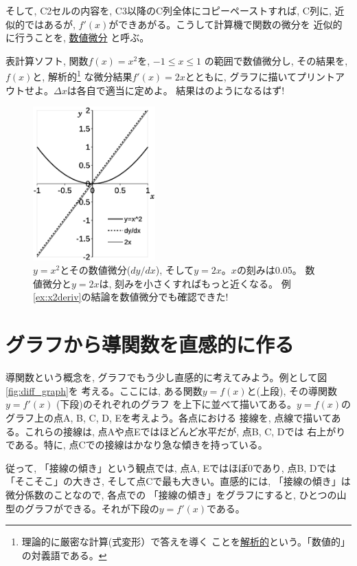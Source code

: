 そして, C2セルの内容を, C3以降のC列全体にコピーペーストすれば, C列に, 
近似的ではあるが, $f'(x)$ができあがる。こうして計算機で関数の微分を
近似的に行うことを, \underline{数値微分} と呼ぶ。\hv

\begin{q}\label{q:comp_diff0} 表計算ソフト, 関数$f(x)=x^2$を, $-1 \le x \le 1$
の範囲で数値微分し, その結果を, $f(x)$と, 解析的\footnote{理論的に厳密な計算(式変形）で答えを導く
ことを\underline{解析的}という。「数値的」の対義語である。}
な微分結果$f'(x)=2x$とともに, グラフに描いてプリントアウトせよ。$\Delta x$は各自で適当に定めよ。
結果はのようになるはず!
\end{q}
\begin{figure}[!h]
    \centering
    \includegraphics[width=4.7cm]{diffx2.eps}
    \caption{$y=x^2$とその数値微分($dy/dx$), そして$y=2x$。$x$の刻みは0.05。
数値微分と$y=2x$は, 刻みを小さくすればもっと近くなる。
例\ref{ex:x2deriv}の結論を数値微分でも確認できた!\label{fig:diffx2}}
\end{figure}
\hv


\section{グラフから導関数を直感的に作る}

導関数という概念を, グラフでもう少し直感的に考えてみよう。例として図\ref{fig:diff_graph}を
考える。ここには, ある関数$y=f(x)$と(上段), その導関数$y=f'(x)$ (下段)のそれぞれのグラフ
を上下に並べて描いてある。$y=f(x)$のグラフ上の点A, B, C, D, Eを考えよう。各点における
接線を, 点線で描いてある。これらの接線は, 点Aや点Eではほどんど水平だが, 点B, C, Dでは
右上がりである。特に, 点Cでの接線はかなり急な傾きを持っている。

従って, 「接線の傾き」という観点では, 点A, Eではほぼ0であり, 点B, Dでは「そこそこ」の大きさ, 
そして点Cで最も大きい。直感的には, 「接線の傾き」は微分係数のことなので, 各点での
「接線の傾き」をグラフにすると, ひとつの山型のグラフができる。それが下段の$y=f'(x)$である。

